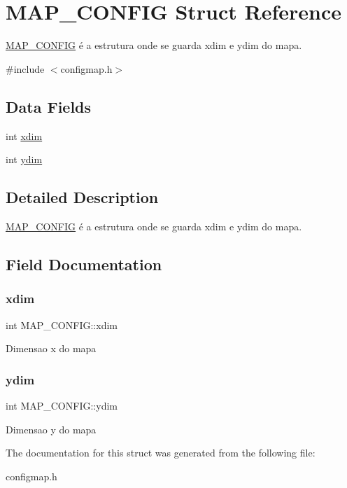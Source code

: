 \hypertarget{struct_m_a_p___c_o_n_f_i_g}{}\section{M\+A\+P\+\_\+\+C\+O\+N\+F\+IG Struct Reference}
\label{struct_m_a_p___c_o_n_f_i_g}


\mbox{\hyperlink{struct_m_a_p___c_o_n_f_i_g}{M\+A\+P\+\_\+\+C\+O\+N\+F\+IG}} é a estrutura onde se guarda xdim e ydim do mapa.  




{\ttfamily \#include $<$configmap.\+h$>$}

\subsection*{Data Fields}
\begin{DoxyCompactItemize}
\item 
int \mbox{\hyperlink{struct_m_a_p___c_o_n_f_i_g_ade8a779165793714b9b147dc357afc4c}{xdim}}
\item 
int \mbox{\hyperlink{struct_m_a_p___c_o_n_f_i_g_a5da3acf63cab314c37da2568328fdc8f}{ydim}}
\end{DoxyCompactItemize}


\subsection{Detailed Description}
\mbox{\hyperlink{struct_m_a_p___c_o_n_f_i_g}{M\+A\+P\+\_\+\+C\+O\+N\+F\+IG}} é a estrutura onde se guarda xdim e ydim do mapa. 

\subsection{Field Documentation}
\mbox{\label{struct_m_a_p___c_o_n_f_i_g_ade8a779165793714b9b147dc357afc4c}} 
\subsubsection{\texorpdfstring{xdim}{xdim}}
{\footnotesize\ttfamily int M\+A\+P\+\_\+\+C\+O\+N\+F\+I\+G\+::xdim}

Dimensao x do mapa \mbox{\label{struct_m_a_p___c_o_n_f_i_g_a5da3acf63cab314c37da2568328fdc8f}} 
\subsubsection{\texorpdfstring{ydim}{ydim}}
{\footnotesize\ttfamily int M\+A\+P\+\_\+\+C\+O\+N\+F\+I\+G\+::ydim}

Dimensao y do mapa 

The documentation for this struct was generated from the following file\+:\begin{DoxyCompactItemize}
\item 
configmap.\+h\end{DoxyCompactItemize}
